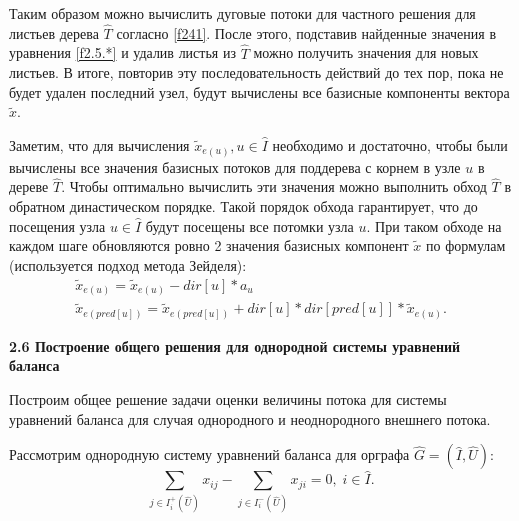 \documentclass[14pt]{extarticle}%
\begin{document}
Таким образом можно вычислить дуговые потоки для частного решения для листьев дерева $\widehat{T}$ согласно \eqref{f241}. После этого, подставив найденные значения в уравнения \eqref{f2.5.*} и удалив листья из $\widehat{T}$ можно получить значения для новых листьев. В итоге, повторив эту последовательность действий до тех пор, пока не будет удален последний узел, будут вычислены все базисные компоненты вектора $\widetilde x$.

Заметим, что для вычисления $\widetilde{x}_{e(u)}, u\in \widehat{I}$ необходимо и достаточно, чтобы были вычислены все значения базисных потоков для поддерева с корнем в узле $u$ в дереве $\widehat{T}$. Чтобы оптимально вычислить эти значения можно выполнить обход $\widehat{T}$ в обратном династическом порядке. Такой порядок обхода гарантирует, что до посещения узла $u\in \widehat{I}$ будут посещены все потомки узла $u$. При таком обходе на каждом шаге обновляются ровно 2 значения базисных компонент $\widetilde x$ по формулам (используется подход метода Зейделя):
\begin{equation}\label{f242}
\begin{gathered}
\widetilde{x}_{e(u)}= \widetilde{x}_{e(u)}-dir[u]*a_u\\
\widetilde{x}_{e(pred[u])}=\widetilde{x}_{e(pred[u])} + dir[u]*dir[pred[u]]*\widetilde{x}_{e(u)}.
\end{gathered}
\end{equation}

\textbf{2.6 Построение общего решения для однородной системы уравнений баланса}

Построим общее решение задачи оценки величины потока для системы уравнений баланса для случая однородного и неоднородного внешнего потока.

Рассмотрим однородную систему уравнений баланса для орграфа $\widehat{G}=(\widehat{I},\widehat{U})$:
\begin{equation}\label{f2.6.1}
	\sum_{j\in I^+_i(\widehat{U})} x_{ij}-\sum_{j\in I^-_i(\widehat{U})}x_{ji}=0,\; i\in \widehat{I}.
\end{equation}
\end{document}
